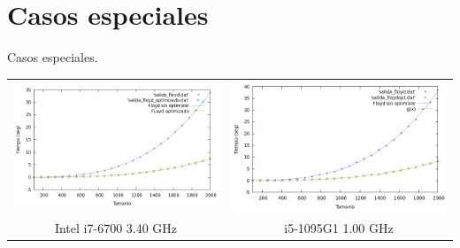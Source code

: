 \documentclass[10pt, xcolor=table]{beamer}
\begin{document}
\section{Casos especiales}

\begin{frame}[fragile]{Casos especiales.
}
\centering
\begin{tabular}{cc}
\includegraphics[scale=0.2]{../../Images/floyd_opt_Javi5454.png}
&
\includegraphics[scale=0.2]{../../Images/floyd_opt_Jota.png}
\\
Intel i7-6700 3.40 GHz & i5-1095G1 1.00 GHz
\end{tabular}
\end{frame}
\end{document}
